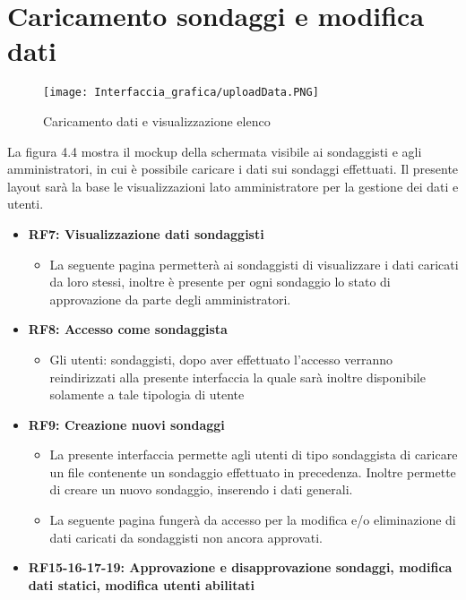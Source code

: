 \section{Caricamento sondaggi e modifica dati}
    \label{fig:4.4}
    \begin{figure}[H]
        \center
        \texttt{[image: Interfaccia\_grafica/uploadData.PNG]}
        \caption{Caricamento dati e visualizzazione elenco}
    \end{figure} 
    La figura 4.4 mostra il mockup della schermata visibile ai sondaggisti e agli amministratori, in cui è possibile caricare i dati sui sondaggi effettuati.\newline
    Il presente layout sarà la base le visualizzazioni lato amministratore per la gestione dei dati e utenti.
    \begin{itemize}
        \item \textbf{RF7: Visualizzazione dati sondaggisti} \begin{itemize}
            \item La seguente pagina permetterà ai sondaggisti di visualizzare i dati caricati da loro stessi, inoltre è presente per ogni sondaggio lo stato di approvazione da parte degli amministratori.
        \end{itemize}
        \item \textbf{RF8: Accesso come sondaggista} \begin{itemize}
            \item Gli utenti: sondaggisti, dopo aver effettuato l'accesso verranno reindirizzati alla presente interfaccia la quale sarà inoltre disponibile solamente a tale tipologia di utente
        \end{itemize}
        \item \textbf{RF9: Creazione nuovi sondaggi} \begin{itemize}
            \item La presente interfaccia permette agli utenti di tipo sondaggista di caricare un file contenente un sondaggio effettuato in precedenza. Inoltre permette di creare un nuovo sondaggio, inserendo i dati generali.
            \item La seguente pagina fungerà da accesso per la modifica e/o eliminazione di dati caricati da sondaggisti non ancora approvati.
        \end{itemize}
        \item \textbf{RF15-16-17-19: Approvazione e disapprovazione sondaggi, modifica dati statici, modifica utenti abilitati} \begin{itemize}

\end{itemize}
\end{itemize}
